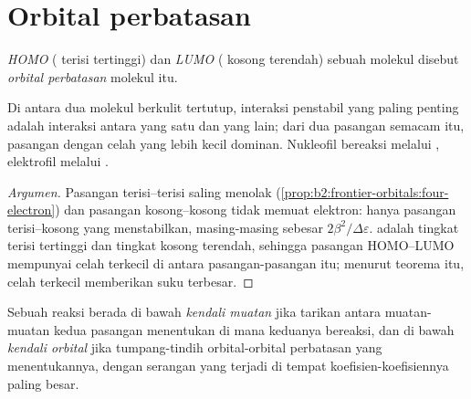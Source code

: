 \section{Orbital perbatasan}

\begin{definition}\label{def:b2:frontier-orbitals:frontier}
\emph{HOMO} ( terisi tertinggi) dan
\emph{LUMO} ( kosong terendah) sebuah molekul
disebut \emph{orbital perbatasan} molekul itu.
\end{definition}

\begin{proposition}\label{prop:b2:frontier-orbitals:dominant}
Di antara dua molekul berkulit tertutup, interaksi penstabil yang paling
penting adalah interaksi antara  yang satu dan  yang lain; dari dua
pasangan semacam itu, pasangan dengan celah yang lebih kecil dominan.
Nukleofil bereaksi melalui , elektrofil melalui .
\end{proposition}

\begin{proof}[Argumen]
Pasangan terisi--terisi saling menolak
(\cref{prop:b2:frontier-orbitals:four-electron}) dan pasangan kosong--kosong
tidak memuat elektron: hanya pasangan terisi--kosong yang menstabilkan,
masing-masing sebesar $2\beta^2/\Delta\varepsilon$.  adalah tingkat terisi
tertinggi dan  tingkat kosong terendah, sehingga pasangan HOMO--LUMO
mempunyai celah terkecil di antara pasangan-pasangan itu; menurut teorema
itu, celah terkecil memberikan suku terbesar.
\end{proof}

\begin{definition}\label{def:b2:frontier-orbitals:control}
Sebuah reaksi berada di bawah \emph{kendali muatan}
jika tarikan antara muatan-muatan kedua pasangan menentukan di mana
keduanya bereaksi, dan di bawah \emph{kendali orbital}
jika tumpang-tindih orbital-orbital perbatasan yang menentukannya, dengan
serangan yang terjadi di tempat koefisien-koefisiennya paling besar.
\end{definition}

